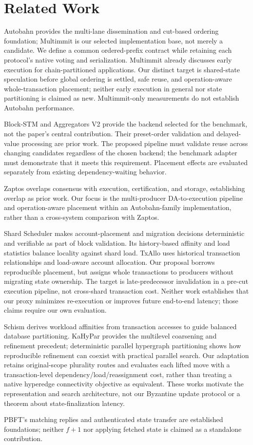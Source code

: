 \section{Related Work}
\label{sec:related}

Autobahn provides the multi-lane dissemination and cut-based ordering foundation; Multimmit is our selected implementation base, not merely a candidate. We define a common ordered-prefix contract while retaining each protocol's native voting and serialization. Multimmit already discusses early execution for chain-partitioned applications. Our distinct target is shared-state speculation before global ordering is settled, safe reuse, and operation-aware whole-transaction placement; neither early execution in general nor state partitioning is claimed as new. Multimmit-only measurements do not establish Autobahn performance. \citep{autobahn,multimmit}

Block-STM and Aggregators V2 provide the backend selected for the benchmark, not the paper's central contribution. Their preset-order validation and delayed-value processing are prior work. The proposed pipeline must validate reuse across changing candidates regardless of the chosen backend; the benchmark adapter must demonstrate that it meets this requirement. Placement effects are evaluated separately from existing dependency-waiting behavior. \citep{blockstm,aip47}

Zaptos overlaps consensus with execution, certification, and storage, establishing overlap as prior work. Our focus is the multi-producer DA-to-execution pipeline and operation-aware placement within an Autobahn-family implementation, rather than a cross-system comparison with Zaptos. \citep{zaptos}

Shard Scheduler makes account-placement and migration decisions deterministic and verifiable as part of block validation. Its history-based affinity and load statistics balance locality against shard load. TxAllo uses historical transaction relationships and load-aware account allocation. Our proposal borrows reproducible placement, but assigns whole transactions to producers without migrating state ownership. The target is late-predecessor invalidation in a pre-cut execution pipeline, not cross-shard transaction cost. Neither work establishes that our proxy minimizes re-execution or improves future end-to-end latency; those claims require our own evaluation. \citep{shardscheduler,txallo}

Schism derives workload affinities from transaction accesses to guide balanced database partitioning. KaHyPar provides the multilevel coarsening and refinement precedent; deterministic parallel hypergraph partitioning shows how reproducible refinement can coexist with practical parallel search. Our adaptation retains original-scope plurality routes and evaluates each lifted move with a transaction-level dependency/load/reassignment cost, rather than treating a native hyperedge connectivity objective as equivalent. These works motivate the representation and search architecture, not our Byzantine update protocol or a theorem about state-finalization latency. \citep{schism,kahypar,deterministicHypergraph}

PBFT's matching replies and authenticated state transfer are established foundations; neither \(f+1\) nor applying fetched state is claimed as a standalone contribution. \citep{pbft}
